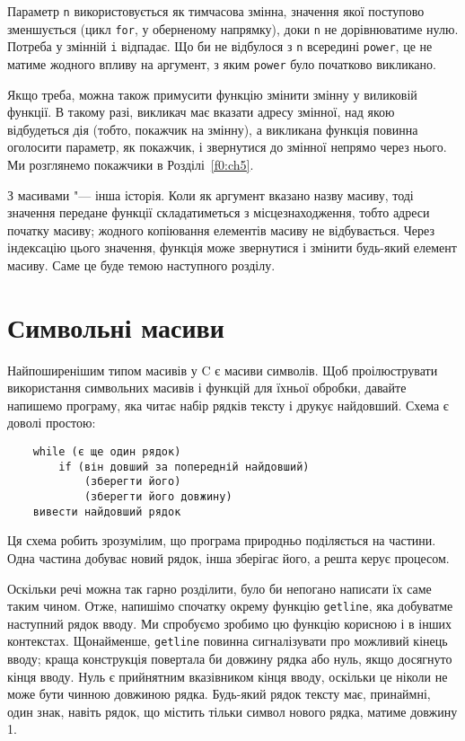 \documentclass[a4paper,12pt]{book}
\begin{document}
  Параметр \texttt{n} використовується як тимчасова змінна, значення якої поступово
  зменшується (цикл \texttt{for}, у оберненому напрямку), доки \texttt{n} не дорівнюватиме
  нулю. Потреба у змінній \texttt{i} відпадає. Що би не відбулося з \texttt{n} всередині
  \texttt{power}, це не матиме жодного впливу на аргумент, з яким \texttt{power} було
  початково викликано.

  Якщо треба, можна також примусити функцію змінити змінну у виликовій функції. В такому
  разі, викликач має вказати адресу змінної, над якою відбудеться дія (тобто, покажчик на
  змінну), а викликана функція повинна оголосити параметр, як покажчик, і звернутися до
  змінної непрямо через нього. Ми розглянемо покажчики в Розділі~\ref{f0:ch5}.

  З масивами "--- інша історія. Коли як аргумент вказано назву масиву, тоді значення
  передане функції складатиметься з місцезнаходження, тобто адреси початку масиву; жодного
  копіювання елементів масиву не відбувається. Через індексацію цього значення, функція
  може звернутися і змінити будь-який елемент масиву. Саме це буде темою наступного
  розділу.

\section{Символьні масиви}

\label{f0:ch1.9}
  Найпоширенішим типом масивів у C є масиви символів. Щоб проілюструвати використання
  символьних масивів і функцій для їхньої обробки, давайте напишемо програму, яка читає
  набір рядків тексту і друкує найдовший. Схема є доволі простою:
  \begin{verbatim}
    while (є ще один рядок)
        if (він довший за попередній найдовший)
            (зберегти його)
            (зберегти його довжину)
    вивести найдовший рядок
  \end{verbatim}

  Ця схема робить зрозумілим, що програма природньо поділяється на частини. Одна частина
  добуває новий рядок, інша зберігає його, а решта керує процесом.

  Оскільки речі можна так гарно розділити, було би непогано написати їх саме таким чином.
  Отже, напишімо спочатку окрему функцію \texttt{getline}, яка добуватме наступний рядок
  вводу. Ми спробуємо зробимо цю функцію корисною і в інших контекстах. Щонайменше,
  \texttt{getline} повинна сигналізувати про можливий кінець вводу; краща конструкція
  повертала би довжину рядка або нуль, якщо досягнуто кінця вводу. Нуль є прийнятним
  вказівником кінця вводу, оскільки це ніколи не може бути чинною довжиною рядка.
  Будь-який рядок тексту має, принаймні, один знак, навіть рядок, що містить тільки символ
  нового рядка, матиме довжину 1.
\end{document}
